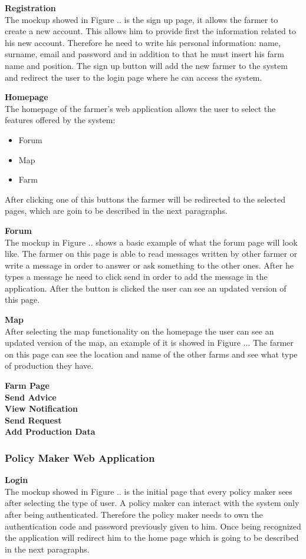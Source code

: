 \textbf{Registration} \\
The mockup showed in Figure .. is the sign up page, it allows the farmer to create a new account. This allows him to provide first the information related to his new account. 
Therefore he need to write his personal information: name, surname, email and password and in addition to that he must insert his farm name and position.
The sign up button will add the new farmer to the system and redirect the user to the login page where he can access the system.

\textbf{Homepage}\\
The homepage of the farmer's web application allows the user to select the features offered by the system:
\begin{itemize}
    \item Forum
    \item Map
    \item Farm
\end{itemize}
After clicking one of this buttons the farmer will be redirected to the selected pages, which are goin to be described in the next paragraphs.

\textbf{Forum}\\
The mockup in Figure .. shows a basic example of what the forum page will look like. The farmer on this page is able to read messages written by other farmer or 
write a message in order to answer or ask something to the other ones. After he types a message he need to click send in order to add the message in the application. 
After the button is clicked the user can see an updated version of this page.

\textbf{Map}\\
After selecting the map functionality on the homepage the user can see an updated version of the map, 
an example of it is showed in Figure ... The farmer on this page can see the location and name of the other farms and see what type of production 
they have.


\textbf{Farm Page}\\ 


\textbf{Send Advice}\\


\textbf{View Notification}\\


\textbf{Send Request}\\


\textbf{Add Production Data}\\


\subsubsection{Policy Maker Web Application}
\textbf{Login} \\
The mockup showed in Figure .. is the initial page that every policy maker sees after selecting the type of user.
A policy maker can interact with the system only after being authenticated. Therefore the policy maker needs to own the authentication code and password previously given to him.
Once being recognized the application will redirect him to the home page which is going to be described in the next paragraphs.